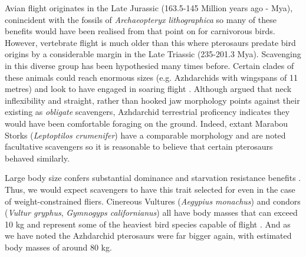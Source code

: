 \documentclass[a4paper,12pt]{article}
\begin{document}
Avian flight originates in the Late Jurassic (163.5-145 Million years ago - Mya), conincident with the fossils of \textit{Archaeopteryx lithographica} so many of these benefits would have been realised from that point on for carnivorous birds. However, vertebrate flight is much older than this where pterosaurs predate bird origins by a considerable margin in the Late Triassic (235-201.3 Mya). Scavenging in this diverse group has been hypothesied many times before. Certain clades of these animals could reach enormous sizes (e.g. Azhdarchids with wingspans of 11 metres)%
 and look to have engaged in soaring flight \citep{witton2010size}. Although \cite{witton2008reappraisal} argued that neck inflexibility and straight, rather than hooked jaw morphology points against their existing as \textit{obligate} scavengers, Azhdarchid terrestrial proficency indicates they would have been comfortable foraging on the ground. Indeed, extant Marabou Storks (\textit{Leptoptilos crumenifer}) %
have a comparable morphology and are noted facultative scavengers so it is reasonable to believe that certain pterosaurs behaved similarly.  

Large body size confers substantial dominance and starvation resistance benefits \citep{ruxton2004obligate}. Thus, we would expect scavengers to have this trait selected for even in the case of weight-constrained fliers. Cinereous Vultures (\textit{Aegypius monachus}) and condors (\textit{Vultur gryphus}, \textit{Gymnogyps californianus}) all have body masses that can exceed 10 kg and represent some of the heaviest bird species capable of flight \citep{ferguson2001raptors,donazar2002effects}. And as we have noted the Azhdarchid pterosaurs were far bigger again, with estimated body masses of around 80 kg. 
 
\end{document}

